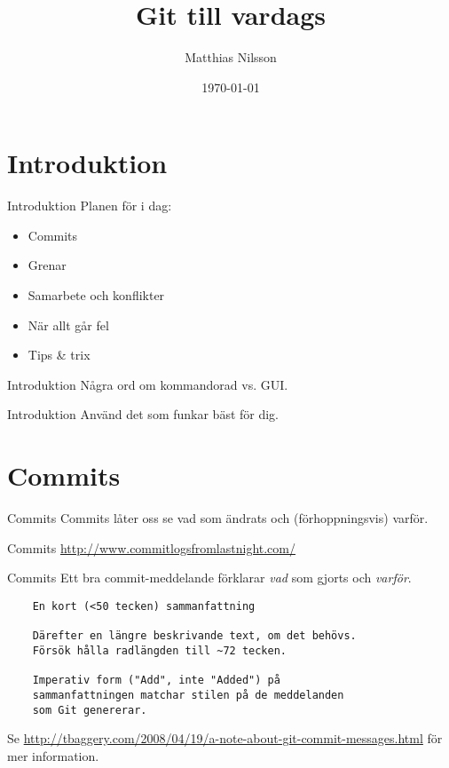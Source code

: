 \documentclass[11pt,xetex]{beamer}
\title{Git till vardags}
\date{\today}
\author{Matthias Nilsson}
\begin{document}
\maketitle


\section*{Introduktion}

\begin{frame}{Introduktion}
  \Large
  Planen för i dag:

  \begin{itemize}
    \item Commits
    \item Grenar
    \item Samarbete och konflikter
    \item När allt går fel
    \item Tips \& trix
  \end{itemize}
\end{frame}

\begin{frame}{Introduktion}
  \Large
  Några ord om kommandorad vs. GUI.
\end{frame}

\begin{frame}{Introduktion}
  \Large
  Använd det som funkar bäst för dig.
\end{frame}

\section*{Commits}

\begin{frame}{Commits}
  \Large
  Commits låter oss se vad som ändrats och (förhoppningsvis) varför.
\end{frame}

\begin{frame}{Commits}
  \Large
  \url{http://www.commitlogsfromlastnight.com/}
\end{frame}

\begin{frame}[fragile]{Commits}
  \Large
  Ett bra commit-meddelande förklarar \emph{vad} som gjorts och \emph{varför}.

  \begin{verbatim}
    En kort (<50 tecken) sammanfattning

    Därefter en längre beskrivande text, om det behövs.
    Försök hålla radlängden till ~72 tecken.

    Imperativ form ("Add", inte "Added") på
    sammanfattningen matchar stilen på de meddelanden
    som Git genererar.
  \end{verbatim}

  \normalsize
  Se
  \url{http://tbaggery.com/2008/04/19/a-note-about-git-commit-messages.html}
  för mer information.
\end{frame}
\end{document}
